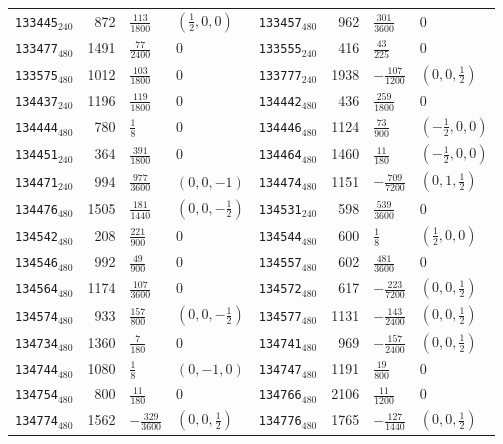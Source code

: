 {\begin{longtable}{@{}lrll@{\hspace{2em}}lrll@{}}
\texttt{133445}$_{240}$ & 872 & $\tfrac{113}{1800}$ & $(\tfrac{1}{2},0,0)$ & \texttt{133457}$_{480}$ & 962 & $\tfrac{301}{3600}$ & 0\\
\texttt{133477}$_{480}$ & 1491 & $\tfrac{77}{2400}$ & 0 & \texttt{133555}$_{240}$ & 416 & $\tfrac{43}{225}$ & 0\\
\texttt{133575}$_{480}$ & 1012 & $\tfrac{103}{1800}$ & 0 & \texttt{133777}$_{240}$ & 1938 & $-\tfrac{107}{1200}$ & $(0,0,\tfrac{1}{2})$\\
\texttt{134437}$_{240}$ & 1196 & $\tfrac{119}{1800}$ & 0 & \texttt{134442}$_{480}$ & 436 & $\tfrac{259}{1800}$ & 0\\
\texttt{134444}$_{480}$ & 780 & $\tfrac{1}{8}$ & 0 & \texttt{134446}$_{480}$ & 1124 & $\tfrac{73}{900}$ & $(-\tfrac{1}{2},0,0)$\\
\texttt{134451}$_{240}$ & 364 & $\tfrac{391}{1800}$ & 0 & \texttt{134464}$_{480}$ & 1460 & $\tfrac{11}{180}$ & $(-\tfrac{1}{2},0,0)$\\
\texttt{134471}$_{240}$ & 994 & $\tfrac{977}{3600}$ & $(0,0,-1)$ & \texttt{134474}$_{480}$ & 1151 & $-\tfrac{709}{7200}$ & $(0,1,\tfrac{1}{2})$\\
\texttt{134476}$_{480}$ & 1505 & $\tfrac{181}{1440}$ & $(0,0,-\tfrac{1}{2})$ & \texttt{134531}$_{240}$ & 598 & $\tfrac{539}{3600}$ & 0\\
\texttt{134542}$_{480}$ & 208 & $\tfrac{221}{900}$ & 0 & \texttt{134544}$_{480}$ & 600 & $\tfrac{1}{8}$ & $(\tfrac{1}{2},0,0)$\\
\texttt{134546}$_{480}$ & 992 & $\tfrac{49}{900}$ & 0 & \texttt{134557}$_{480}$ & 602 & $\tfrac{481}{3600}$ & 0\\
\texttt{134564}$_{480}$ & 1174 & $\tfrac{107}{3600}$ & 0 & \texttt{134572}$_{480}$ & 617 & $-\tfrac{223}{7200}$ & $(0,0,\tfrac{1}{2})$\\
\texttt{134574}$_{480}$ & 933 & $\tfrac{157}{800}$ & $(0,0,-\tfrac{1}{2})$ & \texttt{134577}$_{480}$ & 1131 & $-\tfrac{143}{2400}$ & $(0,0,\tfrac{1}{2})$\\
\texttt{134734}$_{480}$ & 1360 & $\tfrac{7}{180}$ & 0 & \texttt{134741}$_{480}$ & 969 & $-\tfrac{157}{2400}$ & $(0,0,\tfrac{1}{2})$\\
\texttt{134744}$_{480}$ & 1080 & $\tfrac{1}{8}$ & $(0,-1,0)$ & \texttt{134747}$_{480}$ & 1191 & $\tfrac{19}{800}$ & 0\\
\texttt{134754}$_{480}$ & 800 & $\tfrac{11}{180}$ & 0 & \texttt{134766}$_{480}$ & 2106 & $\tfrac{11}{1200}$ & 0\\
\texttt{134774}$_{480}$ & 1562 & $-\tfrac{329}{3600}$ & $(0,0,\tfrac{1}{2})$ & \texttt{134776}$_{480}$ & 1765 & $-\tfrac{127}{1440}$ & $(0,0,\tfrac{1}{2})$\\

\end{longtable}}

